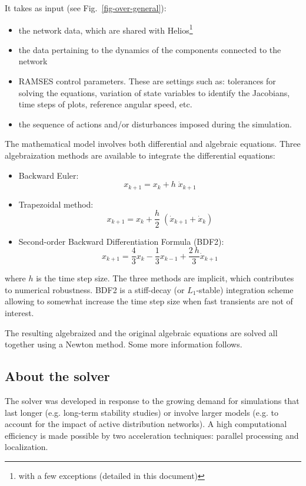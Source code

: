 It takes as input (see Fig.~\ref{fig-over-general}):
\begin{itemize}
\item the network data, which are shared with Helios\footnote{with a few exceptions (detailed in this document)}
\item the data pertaining to the dynamics of the components connected to the network
\item RAMSES control parameters. These are settings such as: tolerances for solving the equations, variation of state variables to identify the Jacobians, time steps of plots, reference angular speed, etc.
\item the sequence of actions and/or disturbances imposed during the simulation.
\end{itemize}

The mathematical model involves both differential and algebraic equations. Three algebraization methods are available to integrate the differential equations:
\begin{itemize}
\item Backward Euler:
\[ x_{k+1} = x_k + h \; \dot{x}_{k+1} \]
\item Trapezoidal method:
\[ x_{k+1} = x_k + \frac{h}{2} \; (\dot{x}_{k+1} + \dot{x}_{k}) \]
\item Second-order Backward Differentiation Formula (BDF2):
\[ x_{k+1} = \frac{4}{3} x_k - \frac{1}{3} x_{k-1} + \frac{2\: h}{3} \dot{x}_{k+1} \]
\end{itemize}
where $h$ is the time step size. The three methods are implicit, which contributes to numerical robustness. 
BDF2 is a stiff-decay (or $L_1$-stable) integration scheme allowing to somewhat increase the time step size when fast transients are not of interest.

The resulting algebraized and the original algebraic equations are solved all together using a Newton method. Some more information follows. 

\subsection{About the solver}

The solver was developed in response to the growing demand for simulations that last longer (e.g. long-term stability studies) or involve larger models (e.g. to account for the impact of active distribution networks). A high computational efficiency is made possible by two acceleration techniques: parallel processing and localization.

